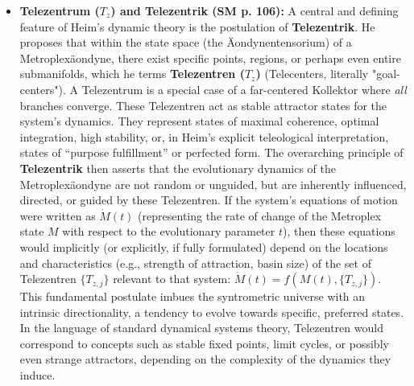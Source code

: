 \documentclass[12pt]{article}
\newcommand{\q}[1]{\enquote{#1}}
\newcommand{\telezentrum}{T_z}
\begin{document}
\begin{itemize}
    \item \textbf{Telezentrum (\( \telezentrum \)) and Telezentrik (SM p. 106):}
    A central and defining feature of Heim's dynamic theory is the postulation of \textbf{Telezentrik}. He proposes that within the state space (the Äondynentensorium) of a Metroplexäondyne, there exist specific points, regions, or perhaps even entire submanifolds, which he terms \textbf{Telezentren (\( \telezentrum \))} (Telecenters, literally "goal-centers"). A Telezentrum is a special case of a far-centered Kollektor where \textit{all} branches converge. These Telezentren act as stable attractor states for the system's dynamics. They represent states of maximal coherence, optimal integration, high stability, or, in Heim's explicit teleological interpretation, states of \q{purpose fulfillment} or perfected form. The overarching principle of \textbf{Telezentrik} then asserts that the evolutionary dynamics of the Metroplexäondyne are not random or unguided, but are inherently influenced, directed, or guided by these Telezentren. If the system's equations of motion were written as \( \dot{M}(t) \) (representing the rate of change of the Metroplex state \(M\) with respect to the evolutionary parameter \(t\)), then these equations would implicitly (or explicitly, if fully formulated) depend on the locations and characteristics (e.g., strength of attraction, basin size) of the set of Telezentren \( \{T_{z,j}\} \) relevant to that system: \( \dot{M}(t) = f(M(t), \{T_{z,j}\}) \). This fundamental postulate imbues the syntrometric universe with an intrinsic directionality, a tendency to evolve towards specific, preferred states. In the language of standard dynamical systems theory, Telezentren would correspond to concepts such as stable fixed points, limit cycles, or possibly even strange attractors, depending on the complexity of the dynamics they induce.


\end{itemize}
\end{document}
